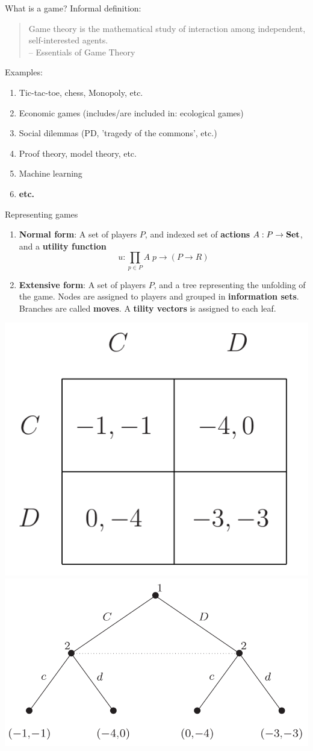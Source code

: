 \begin{frame}{What is a game?}
	Informal definition:

	\vfill
	\begin{quotation}
		Game theory is the mathematical study of interaction among independent, self-interested agents.\\
		{\color{colornote}-- Essentials of Game Theory \cite{leyton2008essentials}}
	\end{quotation}

	\vfill
	Examples:
	\begin{enumerate}
		\item Tic-tac-toe, chess, Monopoly, etc.
		\item Economic games (includes/are included in: ecological games)
		\item Social dilemmas (PD, 'tragedy of the commons', etc.)
		\item Proof theory, model theory, etc.
		\item Machine learning
		\item \textbf{etc.}
	\end{enumerate}
\end{frame}

\begin{frame}{Representing games}
	\vfill
	\begin{enumerate}
		\item \textbf{Normal form}:
		A set of players $P$, and indexed set of \textbf{actions} $A : P \to \mathbf{Set}$, and a \textbf{utility function}
		\begin{equation*}
			u : \prod_{p \in P} A\; p \to (P \to R)
		\end{equation*}

		\item \textbf{Extensive form}:
		A set of players $P$, and a tree representing the unfolding of the game. Nodes are assigned to players and grouped in \textbf{information sets}. Branches are called \textbf{moves}. A \textbf{tility vectors} is assigned to each leaf.
	\end{enumerate}

	\vfill
	\begin{center}
		\includegraphics[width=.4\textwidth]{figures/pd_norm.png}
		\qquad
		\includegraphics[width=.5\textwidth]{figures/pd_ext.png}
	\end{center}
\end{frame}

